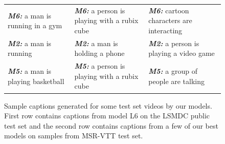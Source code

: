 \begin{figure}[thp]
\begin{center}
\begin{adjustbox}{center}
\begin{tabular}{lll}
    \textbf{\scriptsize\em M6:} \scriptsize a man is running in a gym &
    \textbf{\scriptsize\em M6:} \scriptsize a person is playing with a rubix cube &
    \textbf{\scriptsize\em M6:} \scriptsize cartoon characters are interacting\\
    \textbf{\scriptsize\em M2:} \scriptsize a man is running&
    \textbf{\scriptsize\em M2:} \scriptsize a man is holding a phone&
    \textbf{\scriptsize\em M2:} \scriptsize a person is playing a video game\\
    \textbf{\scriptsize\em M5:} \scriptsize a man is playing basketball&
    \textbf{\scriptsize\em M5:} \scriptsize a person is playing with a rubix cube &
    \textbf{\scriptsize\em M5:} \scriptsize a group of people are talking\\
  \end{tabular}
  \end{adjustbox}
  \end{center}
  \vspace{-5mm}
  \caption{Sample captions generated for some test set videos by our models.
  First row contains captions from model L6 on the LSMDC public test set and the
  second row contains captions from a few of our best models on samples from
  MSR-VTT test set.}
  \label{fig:VttcapSamps}
\end{figure}

